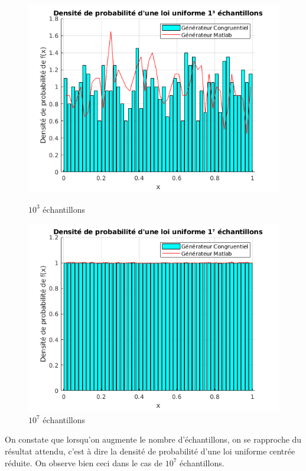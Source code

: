 \documentclass[a4paper,oneside]{article}
\begin{document}
\begin{figure}[h]
    \begin{minipage}[c]{.46\linewidth}
        \centering
        \includegraphics[scale=0.5]{../Exercice1/N=1000.png}
        \caption{$10^3$ échantillons}
    \end{minipage}
    \hfill%
    \begin{minipage}[c]{.46\linewidth}
        \centering
        \includegraphics[scale=0.5]{../Exercice1/N=10000000.png}
        \caption{$10^7$ échantillons}
    \end{minipage}
\end{figure}

On constate que lorsqu'on augmente le nombre d'échantillons, on se rapproche du résultat attendu, c'est à dire la densité de probabilité d'une loi uniforme centrée réduite. On observe bien ceci dans le cas de $10^7$ échantillons.
\end{document}
